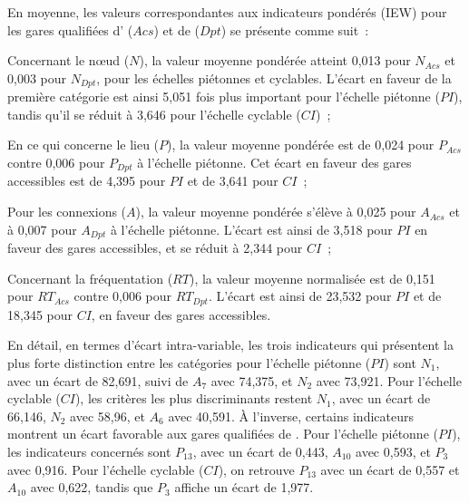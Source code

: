 \begin{refsegment}
En moyenne, les valeurs correspondantes aux indicateurs pondérés (\acrshort{IEW}) pour les gares qualifiées d' (\(Acs\)) et de  (\(Dpt\)) se présente comme suit~:
\begin{customitemize}
    \item Concernant le nœud (\(N\)), la valeur moyenne pondérée atteint 0,013 pour \(N_{Acs}\) et 0,003 pour \(N_{Dpt}\), pour les échelles piétonnes et cyclables. L’écart en faveur de la première catégorie est ainsi 5,051 fois plus important pour l'échelle piétonne (\(PI\)), tandis qu'il se réduit à 3,646 pour l'échelle cyclable (\(CI\))~;
    \item En ce qui concerne le lieu (\(P\)), la valeur moyenne pondérée est de 0,024 pour \(P_{Acs}\) contre 0,006 pour \(P_{Dpt}\) à l’échelle piétonne. Cet écart en faveur des gares accessibles est de 4,395 pour \(PI\) et de 3,641 pour \(CI\)~; 
    \item Pour les connexions (\(A\)), la valeur moyenne pondérée s'élève à 0,025 pour \(A_{Acs}\) et à 0,007 pour \(A_{Dpt}\) à l’échelle piétonne. L’écart est ainsi de 3,518 pour \(PI\) en faveur des gares accessibles, et se réduit à 2,344 pour \(CI\)~;
    \item Concernant la fréquentation (\(RT\)), la valeur moyenne normalisée est de 0,151 pour \(RT_{Acs}\) contre 0,006 pour \(RT_{Dpt}\). L’écart est ainsi de 23,532 pour \(PI\) et de 18,345 pour \(CI\), en faveur des gares accessibles. \end{customitemize}%

En détail, en termes d’écart intra-variable, les trois indicateurs qui présentent la plus forte distinction entre les catégories pour l’échelle piétonne (\(PI\)) sont \(N_{1}\), avec un écart de 82,691, suivi de \(A_{7}\) avec 74,375, et \(N_{2}\) avec 73,921. Pour l’échelle cyclable (\(CI\)), les critères les plus discriminants restent \(N_{1}\), avec un écart de 66,146, \(N_{2}\) avec 58,96, et \(A_{6}\) avec 40,591. À l’inverse, certains indicateurs montrent un écart favorable aux gares qualifiées de . Pour l’échelle piétonne (\(PI\)), les indicateurs concernés sont \(P_{13}\), avec un écart de 0,443, \(A_{10}\) avec 0,593, et \(P_{3}\) avec 0,916. Pour l’échelle cyclable (\(CI\)), on retrouve \(P_{13}\) avec un écart de 0,557 et \(A_{10}\) avec 0,622, tandis que \(P_{3}\) affiche un écart de 1,977.%


\end{refsegment}
